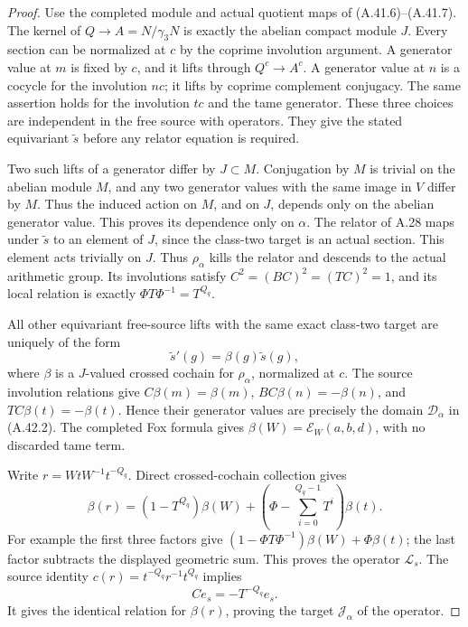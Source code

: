 \begin{proof}
Use the completed module and actual quotient maps of
(A.41.6)--(A.41.7). The kernel of
$Q\to A=N/\gamma_3N$ is exactly the abelian compact module
$J$. Every section can be normalized at $c$ by the coprime
involution argument. A generator value at $m$ is fixed by
$c$, and it lifts through $Q^c\to A^c$. A generator value
at $n$ is a cocycle for the involution $nc$; it lifts by
coprime complement conjugacy. The same assertion holds for
the involution $tc$ and the tame generator. These three
choices are independent in the free source with operators.
They give the stated equivariant $\widetilde s$ before any
relator equation is required.

Two such lifts of a generator differ by $J\subset M$.
Conjugation by $M$ is trivial on the abelian module $M$,
and any two generator values with the same image in $V$
differ by $M$. Thus the induced action on $M$, and on $J$,
depends only on the abelian generator value. This proves its dependence
only on $\alpha$. The relator of A.28 maps under
$\widetilde s$ to an element of $J$, since the class-two
target is an actual section. This element acts trivially
on $J$. Thus $\rho_\alpha$ kills the relator and descends
to the actual arithmetic group. Its involutions satisfy
$C^2=(BC)^2=(TC)^2=1$, and its local relation is exactly
$\Phi T\Phi^{-1}=T^{Q_q}$.

All other equivariant free-source lifts with the same exact
class-two target are uniquely of the form
\[
                    \widetilde s'(g)=\beta(g)\widetilde s(g),
 \tag{A.42.5}
\]
where $\beta$ is a $J$-valued crossed cochain for
$\rho_\alpha$, normalized at $c$. The source involution
relations give
$C\beta(m)=\beta(m)$,
$BC\beta(n)=-\beta(n)$, and
$TC\beta(t)=-\beta(t)$. Hence their generator values are
precisely the domain $\mathcal D_\alpha$ in (A.42.2).
The completed Fox formula gives
$\beta(W)=\mathcal E_W(a,b,d)$, with no discarded tame term.

Write $r=WtW^{-1}t^{-Q_q}$. Direct crossed-cochain collection
gives
\[
 \beta(r)=(1-T^{Q_q})\beta(W)
             +\left(\Phi-\sum_{i=0}^{Q_q-1}T^i\right)\beta(t).
 \tag{A.42.6}
\]
For example the first three factors give
$(1-\Phi T\Phi^{-1})\beta(W)+\Phi\beta(t)$;
the last factor subtracts the displayed geometric sum.
This proves the operator $\mathcal L_s$. The source identity
$c(r)=t^{-Q_q}r^{-1}t^{Q_q}$ implies
\[
                  C e_s=-T^{-Q_q}e_s.
 \tag{A.42.7}
\]
It gives the identical relation for $\beta(r)$, proving
the target $\mathcal J_\alpha$ of the operator.


\end{proof}
